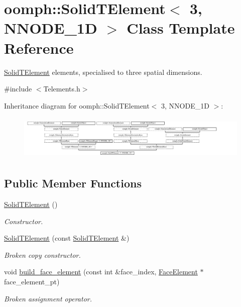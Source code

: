 \hypertarget{classoomph_1_1SolidTElement_3_013_00_01NNODE__1D_01_4}{}\section{oomph\+:\+:Solid\+T\+Element$<$ 3, N\+N\+O\+D\+E\+\_\+1D $>$ Class Template Reference}
\label{classoomph_1_1SolidTElement_3_013_00_01NNODE__1D_01_4}


\hyperlink{classoomph_1_1SolidTElement}{Solid\+T\+Element} elements, specialised to three spatial dimensions.  




{\ttfamily \#include $<$Telements.\+h$>$}

Inheritance diagram for oomph\+:\+:Solid\+T\+Element$<$ 3, N\+N\+O\+D\+E\+\_\+1D $>$\+:\begin{figure}[H]
\begin{center}
\leavevmode
\includegraphics[height=2.170543cm]{classoomph_1_1SolidTElement_3_013_00_01NNODE__1D_01_4}
\end{center}
\end{figure}
\subsection*{Public Member Functions}
\begin{DoxyCompactItemize}
\item 
\hyperlink{classoomph_1_1SolidTElement_3_013_00_01NNODE__1D_01_4_a0413a0020346b450c098eab0f0f4d33f}{Solid\+T\+Element} ()
\begin{DoxyCompactList}\small\item\em Constructor. \end{DoxyCompactList}\item 
\hyperlink{classoomph_1_1SolidTElement_3_013_00_01NNODE__1D_01_4_a634785e0851f5ca510850db7de8f440a}{Solid\+T\+Element} (const \hyperlink{classoomph_1_1SolidTElement}{Solid\+T\+Element} \&)
\begin{DoxyCompactList}\small\item\em Broken copy constructor. \end{DoxyCompactList}\item 
void \hyperlink{classoomph_1_1SolidTElement_3_013_00_01NNODE__1D_01_4_ae363063452694a9412fc9a668730d1fd}{build\+\_\+face\+\_\+element} (const int \&face\+\_\+index, \hyperlink{classoomph_1_1FaceElement}{Face\+Element} $\ast$face\+\_\+element\+\_\+pt)
\begin{DoxyCompactList}\small\item\em Broken assignment operator. \end{DoxyCompactList}\end{DoxyCompactItemize}
